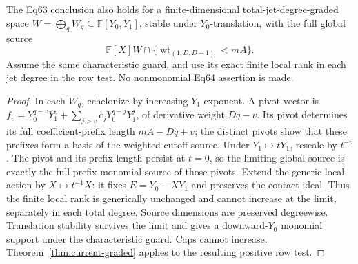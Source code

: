 \begin{corollary}\label{cor:graded-nonmonomial-cost}
The Eq63 conclusion also holds for a finite-dimensional total-jet-degree-graded
space $W=\bigoplus_q W_q\subseteq\mathbb F[Y_0,Y_1]$, stable under
$Y_0$-translation, with the full global source
\[
 \mathbb F[X]W\cap\{\operatorname{wt}_{(1,D,D-1)}<mA\}.
\]
Assume the same characteristic guard, and use its exact finite local rank
in each jet degree in the row test. No nonmonomial Eq64 assertion is made.
\end{corollary}
\begin{proof}
In each $W_q$, echelonize by increasing $Y_1$ exponent. A pivot vector is
$f_v=Y_0^{q-v}Y_1^v+\sum_{j>v}c_jY_0^{q-j}Y_1^j$, of derivative weight
$Dq-v$. Its pivot determines its full coefficient-prefix length
$mA-Dq+v$; the distinct pivots show that these prefixes form a basis of
the weighted-cutoff source. Under $Y_1\mapsto tY_1$, rescale by $t^{-v}$.
The pivot and its prefix length persist at $t=0$, so the limiting global
source is exactly the full-prefix monomial source of those pivots.
Extend the generic local action by $X\mapsto t^{-1}X$: it fixes
$E=Y_0-XY_1$ and preserves the contact ideal. Thus the finite local rank
is generically unchanged and cannot increase at the limit, separately
in each total degree. Source dimensions are preserved degreewise.
Translation stability survives the limit and gives a downward-$Y_0$
monomial support under the characteristic guard. Caps cannot increase.
Theorem~\ref{thm:current-graded} applies to the resulting positive row test.
\end{proof}

